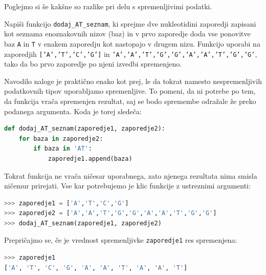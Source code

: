 Poglejmo si še kakšne so razlike pri delu s spremenljivimi podatki.
\begin{zgled}
Napiši funkcijo \texttt{dodaj\_AT\_seznam}, ki sprejme dve nukleotidini zaporedji zapisani kot seznama enoznakovnih nizov (baz) in v prvo zaporedje doda vse ponovitve baz \texttt{A} in \texttt{T} v enakem zaporedju kot nastopajo v drugem nizu. Funkcijo uporabi na zaporedjih \texttt{['A','T','C','G']} in \texttt{'A','A','T','G','G','A','A','T','G','G'}, tako da bo prvo zaporedje po njeni izvedbi spremenjeno.
\end{zgled}
\begin{resitev}
Navodilo naloge je praktično enako kot prej, le da tokrat namesto nespremenljivih podatkovnih tipov uporabljamo spremenljive. To pomeni, da ni potrebe po tem, da funkcija vrača spremenjen rezultat, saj se bodo spremembe odražale že preko podanega argumenta. Koda je torej sledeča:
\begin{lstlisting}[language=Python, showstringspaces=false]
def dodaj_AT_seznam(zaporedje1, zaporedje2):
    for baza in zaporedje2:
        if baza in 'AT':
            zaporedje1.append(baza)
\end{lstlisting}
Tokrat funkcija ne vrača ničesar uporabnega, zato njenega rezultata nima smisla ničemur prirejati. Vse kar potrebujemo je klic funkcije z ustreznimi argumenti:
\begin{lstlisting}[language=Python, showstringspaces=false]
>>> zaporedje1 = ['A','T','C','G']
>>> zaporedje2 = ['A','A','T','G','G','A','A','T','G','G']
>>> dodaj_AT_seznam(zaporedje1, zaporedje2) 
\end{lstlisting}
Prepričajmo se, če je vrednost spremenljivke \texttt{zaporedje1} res spremenjena:
\begin{lstlisting}[language=Python, showstringspaces=false]
>>> zaporedje1
['A', 'T', 'C', 'G', 'A', 'A', 'T', 'A', 'A', 'T']
\end{lstlisting}
\end{resitev}